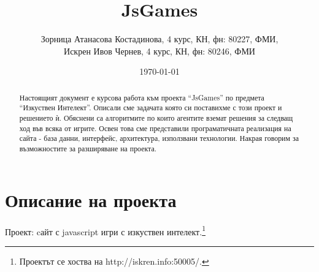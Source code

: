 \documentclass[a4paper]{article}
\def\jsg{JsGames}
\def\jsurl{http://iskren.info:50005/}
\begin{document}
\title{\jsg}
\author{
Зорница Атанасова Костадинова, 4 курс, КН, фн: 80227, ФМИ, \\
Искрен Ивов Чернев, 4 курс, КН, фн: 80246, ФМИ
}
\date{\today}
\maketitle


\begin{abstract}
Настоящият документ е курсова работа към проекта ``\jsg'' по предмета
``Изкуствен Интелект''. Описали сме задачата която си поставихме с този проект
и решението ѝ. Обяснени са алгоритмите по които агентите вземат решения за
следващ ход във всяка от игрите. Освен това сме представили програматичната
реализация на сайта - база данни, интерфейс, архитектура, използвани
технологии. Накрая говорим за възможностите за разширяване на проекта.

\end{abstract}
\newpage

\setcounter{tocdepth}{2}
\tableofcontents
\newpage


\section{Описание на проекта}

Проект: cайт с javascript игри с изкуствен интелект.\footnote{Проектът се хоства на \jsurl.}
\end{document}
